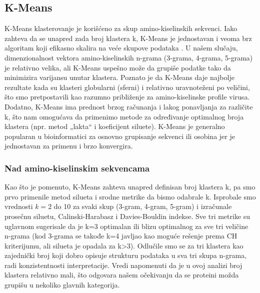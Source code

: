 \documentclass[a4paper,12pt]{article}
\begin{document}
\subsection{K-Means}
K-Means klasterovanje je korišćeno za skup amino-kiselinskih sekvenci. Iako zahteva da se unapred zada broj klastera k, K-Means je jednostavan i veoma brz algoritam koji efikasno skalira na veće skupove podataka . U našem slučaju, dimenzionalnost vektora amino-kiselinskih n-grama (3-grama, 4-grama, 5-grama) je relativno velika, ali K-Means uspešno može da grupiše podatke tako da minimizira varijansu unutar klastera. Poznato je da K-Means daje najbolje rezultate kada su klasteri globularni (sferni) i relativno uravnoteženi po veličini, što smo pretpostavili kao razumno približenje za amino-kiselinske profile virusa. Dodatno, K-Means ima prednost brzog računanja i lakog ponavljanja za različite k, što nam omogućava da primenimo metode za određivanje optimalnog broja klastera (npr. metod „lakta“ i koeficijent siluete). K-Means je generalno popularan u bioinformatici za osnovno grupisanje sekvenci ili osobina jer je jednostavan za primenu i brzo konvergira.

\subsubsection{Nad amino-kiselinskim sekvencama}
\noindent
\begin{minipage}{\textwidth}
Kao što je pomenuto, K-Means zahteva unapred definisan broj klastera k, pa smo prvo primenile metod silueta i srodne metrike da bismo odabrale k. Isprobale smo vrednosti $k=2$ do 10 za svaki skup (3-gram, 4-gram, 5-gram) i izračunale prosečnu siluetu, Calinski-Harabasz i Davies-Bouldin indekse. Sve tri metrike su uglavnom sugerisale da je k=3 optimalan ili blizu optimalnog za sve tri veličine n-grama (kod 3-grama se takođe k=4 javljao kao moguće rešenje prema CH kriterijumu, ali silueta je opadala za k>3). Odlučile smo se za tri klastera kao zajednički broj koji dobro opisuje strukturu podataka u sva tri skupa n-grama, radi konzistentnosti interpretacije. Vredi napomenuti da je u ovoj analizi broj klastera relativno mali, što odgovara našem očekivanju da se proteini možda grupišu u nekoliko glavnih kategorija.
\end{minipage}
\end{document}
